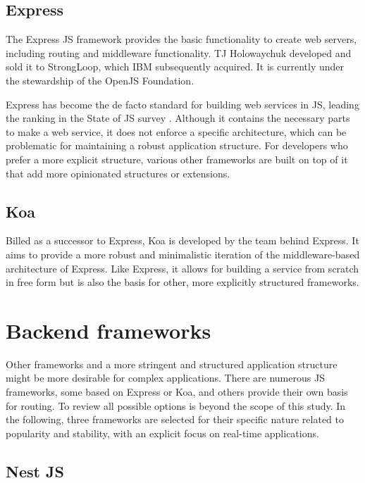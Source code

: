 \subsection{Express}

The Express JS framework provides the basic functionality to create web servers, including routing and middleware functionality. TJ Holowaychuk developed and sold it to StrongLoop, which IBM subsequently acquired. It is currently under the stewardship of the OpenJS Foundation.

Express has become the de facto standard for building web services in JS, leading the ranking in the State of JS survey \parencite{mostUsedBackendFrameworks22}. Although it contains the necessary parts to make a web service, it does not enforce a specific architecture, which can be problematic for maintaining a robust application structure. For developers who prefer a more explicit structure, various other frameworks are built on top of it that add more opinionated structures or extensions.

\subsection{Koa}

Billed as a successor to Express, Koa is developed by the team behind Express. It aims to provide a more robust and minimalistic iteration of the middleware-based architecture of Express. Like Express, it allows for building a service from scratch in free form but is also the basis for other, more explicitly structured frameworks.


\section{Backend frameworks}

Other frameworks and a more stringent and structured application structure might be more desirable for complex applications. There are numerous \ac{JS} frameworks, some based on Express or Koa, and others provide their own basis for routing. To review all possible options is beyond the scope of this study. In the following, three frameworks are selected for their specific nature related to popularity and stability, with an explicit focus on real-time applications.



\subsection{Nest JS}

